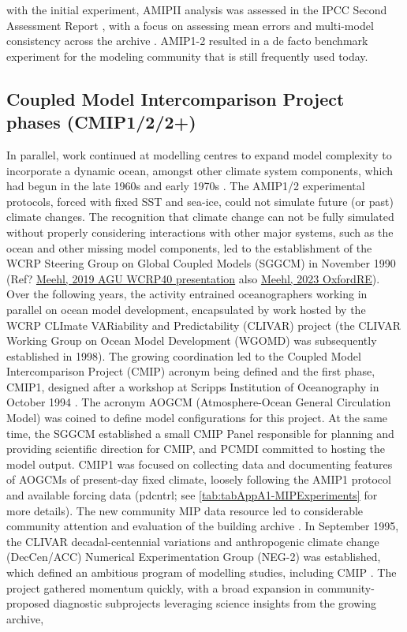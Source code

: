 \documentclass[gmd, preprint]{copernicus}
\def\cred#1{{\color{red}#1}}
\begin{document}
with the initial experiment, AMIPII analysis was assessed in the IPCC Second Assessment Report \citep[SAR;][]{gates_climate_1996}, with a focus on assessing mean errors and multi-model consistency across the archive \citep{gates_amip_1995}.  AMIP1-2 resulted in a de facto benchmark experiment for the modeling community that is still frequently used today.  


\subsection{Coupled Model Intercomparison Project phases (CMIP1/2/2+)}
\label{sec:cmip1And2And2Plus}
In parallel, work continued at modelling centres to expand model complexity to incorporate a dynamic ocean, amongst other climate system components, which had begun in the late 1960s and early 1970s \citep[e.g.,][]{manabe_climate_1969-1,manabe_global_1975,bryan_global_1975}. The AMIP1/2 experimental protocols, forced with fixed SST and sea-ice, could not simulate future (or past) climate changes. The recognition that climate change can not be fully simulated without properly considering interactions with other major systems, such as the ocean and other missing model components, led to the establishment of the WCRP Steering Group on Global Coupled Models (SGGCM) in November 1990 (\cred{Ref? \href{https://www.wcrp-climate.org/images/AGU2019/presentations/Symposium/11-Meehl_WCRP40.pdf}{Meehl, 2019 AGU WCRP40 presentation} also \href{https://doi.org/10.1093/acrefore/9780190228620.013.933}{Meehl, 2023 OxfordRE}}). Over the following years, the activity entrained oceanographers working in parallel on ocean model development, encapsulated by work hosted by the WCRP CLImate VARiability and Predictability (CLIVAR) project (the CLIVAR Working Group on Ocean Model Development (WGOMD) was subsequently established in 1998). The growing coordination led to the Coupled Model Intercomparison Project (CMIP) acronym being defined and the first phase, CMIP1, designed after a workshop at Scripps Institution of Oceanography in October 1994 \citep{meehl_global_1995}. The acronym AOGCM (Atmosphere-Ocean General Circulation Model) was coined to define model configurations for this project. At the same time, the SGGCM established a small CMIP Panel responsible for planning and providing scientific direction for CMIP, and PCMDI committed to hosting the model output. CMIP1 was focused on collecting data and documenting features of AOGCMs of present-day fixed climate, loosely following the AMIP1 protocol and available forcing data (pdcntrl; see \autoref{tab:tabAppA1-MIPExperiments} for more details). The new community MIP data resource led to considerable community attention and evaluation of the building archive \citep{villwock_6th_2003, lambert_cmip1_2001, raisanen_co2-induced_2001}. In September 1995, the CLIVAR decadal-centennial variations and anthropogenic climate change (DecCen/ACC) Numerical Experimentation Group (NEG-2) was established, which defined an ambitious program of modelling studies, including CMIP \citep{villwock_what_1996, coughlan_report_1996}. The project gathered momentum quickly, with a broad expansion in community-proposed diagnostic subprojects leveraging science insights from the growing archive, 
\end{document}
